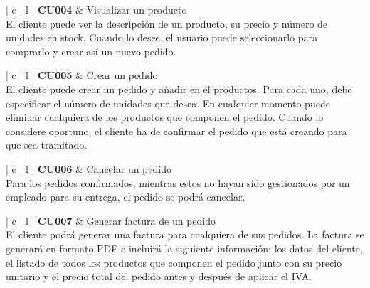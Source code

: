 \documentclass[11pt,spanish,listoffigures]{tfgetsinf}
\begin{document}
\begin{center}
\begin{tabular}{ | c | l | }
\hline
\textbf{ CU004 } & Visualizar un producto \\
\hline
{}
{
El cliente puede ver la descripción de un producto, su precio y número de unidades en stock. Cuando lo desee, el usuario puede seleccionarlo para comprarlo y crear así un nuevo pedido.
} \\
\hline
\end{tabular}
\end{center}

\begin{center}
\begin{tabular}{ | c | l | }
\hline
\textbf{ CU005 } & Crear un pedido \\
\hline
{}
{
El cliente puede crear un pedido y añadir en él productos. Para cada uno, debe especificar el número de unidades que desea. En cualquier momento puede eliminar cualquiera de los productos que componen el pedido. Cuando lo considere oportuno, el cliente ha de confirmar el pedido que está creando para que sea tramitado.
} \\
\hline
\end{tabular}
\end{center}

\begin{center}
\begin{tabular}{ | c | l | }
\hline
\textbf{ CU006 } & Cancelar un pedido \\
\hline
{}
{
Para los pedidos confirmados, mientras estos no hayan sido gestionados por un empleado para su entrega, el pedido se podrá cancelar.
} \\
\hline
\end{tabular}
\end{center}

\begin{center}
\begin{tabular}{ | c | l | }
\hline
\textbf{ CU007 } & Generar factura de un pedido \\
\hline
{}
{
El cliente podrá generar una factura para cualquiera de sus pedidos. La factura se generará en formato PDF e incluirá la siguiente información: los datos del cliente, el listado de todos los productos que componen el pedido junto con su precio unitario y el precio total del pedido antes y después de aplicar el IVA.
} \\
\hline
\end{tabular}
\end{center}
\end{document}
